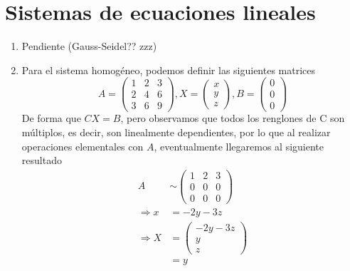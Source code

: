 \documentclass[12pt, letterpaper]{article}
\begin{document}
\section{Sistemas de ecuaciones lineales}
\begin{enumerate}
    \item Pendiente (Gauss-Seidel?? zzz)
    \item Para el sistema homogéneo, podemos definir las siguientes matrices
    \begin{equation*}
        A =
        \begin{pmatrix}
            1 & 2 & 3 \\
            2 & 4 & 6 \\
            3 & 6 & 9
        \end{pmatrix},
        X =
        \begin{pmatrix}
            x \\
            y \\
            z
        \end{pmatrix},
        B =
        \begin{pmatrix}
            0 \\
            0 \\
            0
        \end{pmatrix}
    \end{equation*}
    De forma que $CX = B$, pero observamos que todos los renglones de C son múltiplos, es decir, son linealmente dependientes, por lo que al realizar operaciones elementales con $A$, eventualmente llegaremos al siguiente resultado
    \begin{equation*}
        \begin{aligned}
            A
            & \sim
            \begin{pmatrix}
                1 & 2 & 3 \\
                0 & 0 & 0 \\
                0 & 0 & 0
            \end{pmatrix} \\
            \Rightarrow x
            & = -2y-3z \\
            \Rightarrow X
            & =
            \begin{pmatrix}
                -2y-3z \\
                y \\
                z
            \end{pmatrix} \\
            & = y

\end{aligned}
\end{equation*}
\end{enumerate}
\end{document}
